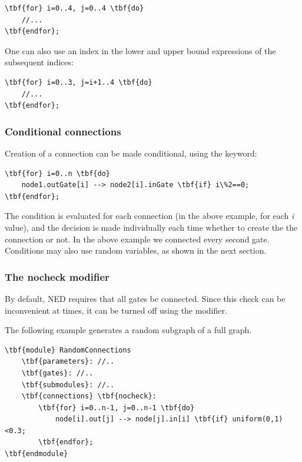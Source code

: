 \begin{Verbatim}[commandchars=\\\{\}]
\tbf{for} i=0..4, j=0..4 \tbf{do}
    //...
\tbf{endfor};
\end{Verbatim}

One can also use an index in the lower and upper bound expressions
of the subsequent indices:

\begin{Verbatim}[commandchars=\\\{\}]
\tbf{for} i=0..3, j=i+1..4 \tbf{do}
    //...
\tbf{endfor};
\end{Verbatim}


\subsubsection{Conditional connections}


Creation of a connection can be made conditional, using the 
keyword:


\begin{Verbatim}[commandchars=\\\{\}]
\tbf{for} i=0..n \tbf{do}
    node1.outGate[i] --> node2[i].inGate \tbf{if} i\%2==0;
\tbf{endfor};
\end{Verbatim}

The  condition is evaluated for each connection
(in the above example, for each \textit{i} value), and the
decision is made individually each time whether to create the
the connection or not. In the above example we connected every
second gate. Conditions may also use random variables, as
shown in the next section.


\subsubsection{The nocheck modifier}

By default, NED requires that all gates be connected. Since this
check can be inconvenient at times, it can be turned off
using the  modifier.

The following example generates a random subgraph of a full graph.

\begin{Verbatim}[commandchars=\\\{\}]
\tbf{module} RandomConnections
    \tbf{parameters}: //..
    \tbf{gates}: //..
    \tbf{submodules}: //..
    \tbf{connections} \tbf{nocheck}:
        \tbf{for} i=0..n-1, j=0..n-1 \tbf{do}
            node[i].out[j] --> node[j].in[i] \tbf{if} uniform(0,1)<0.3;
        \tbf{endfor};
\tbf{endmodule}
\end{Verbatim}

